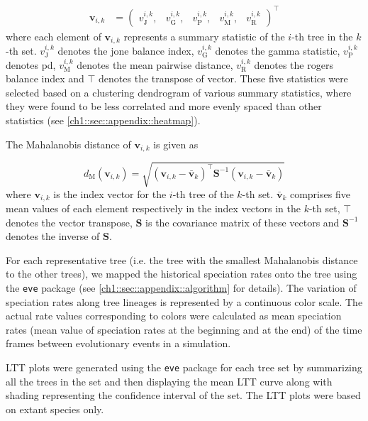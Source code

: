 {\begin{align}
\boldsymbol{v}_{i,k} &= \begin{pmatrix}
       v_\mathrm{J}^{i,k}, &
       v_\mathrm{G}^{i,k}, &
       v_\mathrm{P}^{i,k}, &
       v_\mathrm{M}^{i,k}, &
       v_\mathrm{R}^{i,k}
     \end{pmatrix}^\top
\label{equation:five}
\end{align}
where each element of $\boldsymbol{v}_{i,k}$ represents a summary statistic of the $i$-th tree in the $k$-th set. $v_\mathrm{J}^{i,k}$ denotes the \acrshort{jone} balance index, $v_\mathrm{G}^{i,k}$ denotes the \acrshort{gamma} statistic, $v_\mathrm{P}^{i,k}$ denotes \acrshort{pd}, $v_\mathrm{M}^{i,k}$ denotes the mean pairwise distance, $v_\mathrm{R}^{i,k}$ denotes the \acrshort{rogers} balance index and $\top$ denotes the transpose of vector. These five statistics were selected based on a clustering dendrogram of various summary statistics, where they were found to be less correlated and more evenly spaced than other statistics (see \autoref{ch1::sec::appendix::heatmap}). 

The Mahalanobis distance of $\boldsymbol{v}_{i,k}$ is given as

\begin{equation}
d_{\mathrm{M}}(\boldsymbol{v}_{i,k}) = \sqrt{(\boldsymbol{v}_{i,k} - \bar{\boldsymbol{v}}_k)^\top \boldsymbol{S}^{-1} (\boldsymbol{v}_{i,k} - \bar{\boldsymbol{v}}_k)}
\label{equation:six}
\end{equation}
where $\boldsymbol{v}_{i,k}$ is the index vector for the $i$-th tree of the $k$-th set. $\bar{\boldsymbol{v}}_k$ comprises five mean values of each element respectively in the index vectors in the $k$-th set, $\top$ denotes the vector transpose, $\boldsymbol{S}$ is the covariance matrix of these vectors and $\boldsymbol{S}^{-1}$ denotes the inverse of $\boldsymbol{S}$.

For each representative tree (i.e. the tree with the smallest Mahalanobis distance to the other trees), we mapped the historical speciation rates onto the tree using the \texttt{eve} package (see \autoref{ch1::sec::appendix::algorithm} for details). The variation of speciation rates along tree lineages is represented by a continuous color scale. The actual rate values corresponding to colors were calculated as mean speciation rates (mean value of speciation rates at the beginning and at the end) of the time frames between evolutionary events in a simulation.  

LTT plots were generated using the \texttt{eve} package for each tree set by summarizing all the trees in the set and then displaying the mean LTT curve along with shading representing the confidence interval of the set. The LTT plots were based on extant species only.

}
